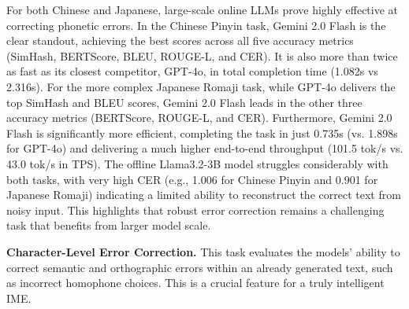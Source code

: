 \documentclass[10pt, a4paper]{article}
\begin{document}
For both Chinese and Japanese, large-scale online LLMs prove highly effective at correcting phonetic errors. In the Chinese Pinyin task, Gemini 2.0 Flash is the clear standout, achieving the best scores across all five accuracy metrics (SimHash, BERTScore, BLEU, ROUGE-L, and CER). It is also more than twice as fast as its closest competitor, GPT-4o, in total completion time (1.082s vs 2.316s). For the more complex Japanese Romaji task, while GPT-4o delivers the top SimHash and BLEU scores, Gemini 2.0 Flash leads in the other three accuracy metrics (BERTScore, ROUGE-L, and CER). Furthermore, Gemini 2.0 Flash is significantly more efficient, completing the task in just 0.735s (vs. 1.898s for GPT-4o) and delivering a much higher end-to-end throughput (101.5 tok/s vs. 43.0 tok/s in TPS). The offline Llama3.2-3B model struggles considerably with both tasks, with very high CER (e.g., 1.006 for Chinese Pinyin and 0.901 for Japanese Romaji) indicating a limited ability to reconstruct the correct text from noisy input. This highlights that robust error correction remains a challenging task that benefits from larger model scale.

\textbf{Character-Level Error Correction.}
This task evaluates the models' ability to correct semantic and orthographic errors within an already generated text, such as incorrect homophone choices. This is a crucial feature for a truly intelligent IME.

\end{document}
